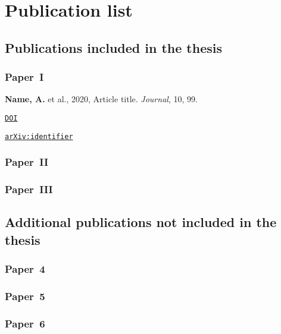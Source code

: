
\chapter{\label{ch:paper_summary}Publication list}

\begin{zeroindent}

  \section*{Publications included in the thesis}
  
  \subsection*{Paper~I}

  \textbf{Name, A.} et al., 2020, Article title. \textit{Journal}, 10, 99.

  \href{https://doi.org/}{\texttt{DOI}}

  \href{https://arxiv.org/}{\texttt{arXiv:identifier}}

  \subsection*{Paper~II}  


  \subsection*{Paper~III}

  
  
  \section*{Additional publications not included in the thesis}

  \subsection*{Paper~4}


  \subsection*{Paper~5}


  \subsection*{Paper~6}
  
  
\end{zeroindent}
